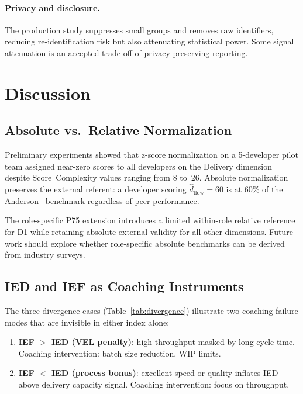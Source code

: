 \documentclass[conference]{IEEEtran}
\begin{document}
\paragraph{Privacy and disclosure.}
The production study suppresses small groups and removes raw identifiers, reducing
re-identification risk but also attenuating statistical power. Some signal
attenuation is an accepted trade-off of privacy-preserving reporting.

\section{Discussion}
\label{sec:discussion}

\subsection{Absolute vs.\ Relative Normalization}

Preliminary experiments showed that z-score normalization on a 5-developer pilot
team assigned near-zero scores to all developers on the Delivery dimension despite
Score~Complexity values ranging from 8 to~26. Absolute normalization preserves the
external referent: a developer scoring $\hat{d}_\text{flow}=60$ is at 60\% of the
Anderson~\cite{anderson2010} benchmark regardless of peer performance.

The role-specific P75 extension introduces a limited within-role relative
reference for D1 while retaining absolute external validity for all other
dimensions. Future work should explore whether role-specific absolute benchmarks
can be derived from industry surveys.

\subsection{IED and IEF as Coaching Instruments}

The three divergence cases (Table~\ref{tab:divergence}) illustrate two coaching
failure modes that are invisible in either index alone:

\begin{enumerate}
  \item \textbf{IEF $>$ IED (VEL penalty)}: high throughput masked by long cycle
    time. Coaching intervention: batch size reduction, WIP limits.
  \item \textbf{IEF $<$ IED (process bonus)}: excellent speed or quality inflates
    IED above delivery capacity signal. Coaching intervention: focus on
    throughput.
\end{enumerate}
\end{document}
